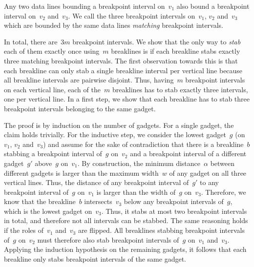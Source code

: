 \documentclass{toc}
\begin{document}
Any two data lines bounding a breakpoint interval on~$v_1$ also bound a breakpoint interval on~$v_2$ and~$v_3$.
We call the three breakpoint intervals on~$v_1$, $v_2$ and~$v_3$ which are bounded by the same data lines \emph{matching} breakpoint intervals.

In total, there are~$3m$ breakpoint intervals.
We show that the only way to \emph{stab} each of them exactly once using~$m$ breaklines is if each breakline stabs exactly three matching breakpoint intervals.
The first observation towards this is that each breakline can only stab a single breakline interval per vertical line because all breakline intervals are pairwise disjoint.
Thus, having~$m$ breakpoint intervals on each vertical line, each of the~$m$ breaklines has to stab exactly three intervals, one per vertical line.
In a first step, we show that each breakline has to stab three breakpoint intervals belonging to the same gadget.


\begin{claimproof}
    The proof is by induction on the number of gadgets.
    For a single gadget, the claim holds trivially.
    For the inductive step, we consider the lowest gadget~$g$ (on~$v_1$, $v_2$ and~$v_3$) and assume for the sake of contradiction that there is a breakline~$b$ stabbing a breakpoint interval of~$g$ on~$v_2$ and a breakpoint interval of a different gadget~$g'$ above~$g$ on~$v_1$.
    By construction, the minimum distance~$\alpha$ between different gadgets is larger than the maximum width~$w$ of any gadget on all three vertical lines.
    Thus, the distance of any breakpoint interval of~$g'$ to any breakpoint interval of~$g$ on~$v_1$ is larger than the width of~$g$ on~$v_3$.
    Therefore, we know that the breakline~$b$ intersects~$v_3$ below any breakpoint intervals of~$g$, which is the lowest gadget on~$v_3$.
    Thus, it stabs at most two breakpoint intervals in total, and therefore not all intervals can be stabbed.
    The same reasoning holds if the roles of~$v_1$ and~$v_3$ are flipped.
    All breaklines stabbing breakpoint intervals of~$g$ on~$v_2$ must therefore also stab breakpoint intervals of~$g$ on~$v_1$ and~$v_3$.
    Applying the induction hypothesis on the remaining gadgets, it follows that each breakline only stabs breakpoint intervals of the same gadget.
\end{claimproof}
\end{document}
